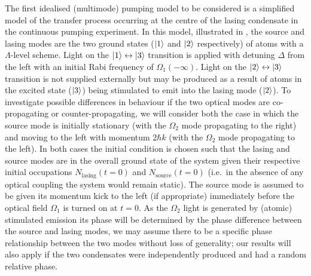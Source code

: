 The first idealised (multimode) pumping model to be considered is a simplified model of the transfer process occurring at the centre of the lasing condensate in the continuous pumping experiment.  In this model, illustrated in , the source and lasing modes are the two ground states (${\left|1\right>}$ and ${\left|2\right>}$ respectively) of atoms with a $\Lambda$-level scheme.  Light on the ${\left|1\right>} \leftrightarrow {\ensuremath{\left|3\right>}}$ transition is applied with detuning $\Delta$ from the left with an initial Rabi frequency of $\Omega_1(-\infty)$.  Light on the ${\left|2\right>} \leftrightarrow {\ensuremath{\left|3\right>}}$ transition is not supplied externally but may be produced as a result of atoms in the excited state (${\left|3\right>}$) being stimulated to emit into the lasing mode (${\left|2\right>}$).  To investigate possible differences in behaviour if the two optical modes are co-propagating or counter-propagating, we will consider both the case in which the source mode is initially stationary (with the $\Omega_2$ mode propagating to the right) and moving to the left with momentum $2 \hbar k$ (with the $\Omega_2$ mode propagating to the left).  In both cases the initial condition is chosen such that the lasing and source modes are in the overall ground state of the system given their respective initial occupations $N_\text{lasing}(t=0)$ and $N_\text{source}(t=0)$ (i.e.\  in the absence of any optical coupling the system would remain static).  The source mode is assumed to be given its momentum kick to the left (if appropriate) immediately before the optical field $\Omega_1$ is turned on at $t=0$.  As the $\Omega_2$ light is generated by (atomic) stimulated emission its phase will be determined by the phase difference between the source and lasing modes, we may assume there to be a specific phase relationship between the two modes without loss of generality; our results will also apply if the two condensates were independently produced and had a random relative phase.

